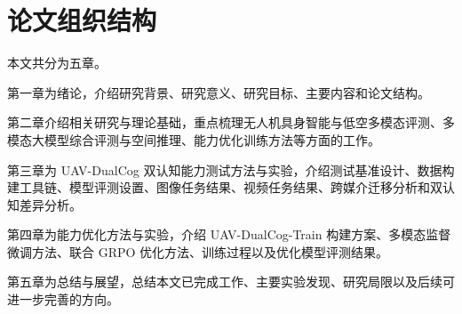 \section{论文组织结构}

本文共分为五章。

第一章为绪论，介绍研究背景、研究意义、研究目标、主要内容和论文结构。

第二章介绍相关研究与理论基础，重点梳理无人机具身智能与低空多模态评测、多模态大模型综合评测与空间推理、能力优化训练方法等方面的工作。

第三章为 UAV-DualCog 双认知能力测试方法与实验，介绍测试基准设计、数据构建工具链、模型评测设置、图像任务结果、视频任务结果、跨媒介迁移分析和双认知差异分析。

第四章为能力优化方法与实验，介绍 UAV-DualCog-Train 构建方案、多模态监督微调方法、联合 GRPO 优化方法、训练过程以及优化模型评测结果。

第五章为总结与展望，总结本文已完成工作、主要实验发现、研究局限以及后续可进一步完善的方向。
